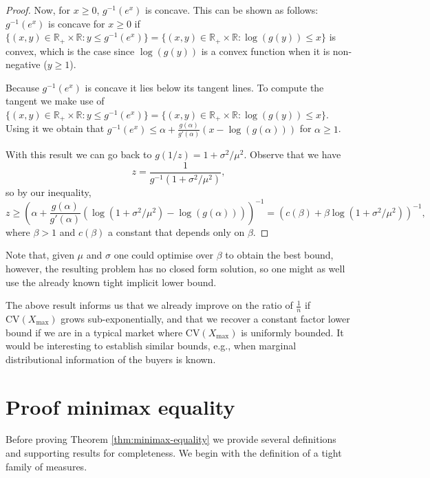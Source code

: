 \documentclass[11pt,a4paper]{article}
\numberwithin{equation}{section}
\begin{document}
\begin{proof}
Now, for $x\ge 0$, $g^{-1}(e^x)$ is concave. This can be shown as follows: $g^{-1}(e^x)$ is concave for $x\ge 0$ if $\{(x,y)\in\mathbb{R}_+\times\mathbb{R}:y\le g^{-1}(e^x)\}=\{(x,y)\in\mathbb{R}_+\times\mathbb{R}: \log(g(y))\le x\}$ is convex, which is the case since $\log(g(y))$ is a convex function when it is non-negative ($y\ge 1$).


Because $g^{-1}(e^x)$ is concave it lies below its tangent lines. To compute the tangent we make use of
$\{(x,y)\in\mathbb{R}_+\times\mathbb{R}:y\le g^{-1}(e^x)\}=\{(x,y)\in\mathbb{R}_+\times\mathbb{R}: \log(g(y))\le x\}$. Using it we obtain that 
$g^{-1}(e^x)\le \alpha+\frac{g\left(\alpha\right)}{g'\left(\alpha\right)}\left(x-\log\left(g\left(\alpha\right)\right)\right)$ for $\alpha\ge 1$.

With this result we can go back to $g(1/z)=1+\sigma^2/\mu^2$. Observe that we have $$z=\frac{1}{g^{-1}(1+\sigma^2/\mu^2)},$$ so by our inequality,
$$z\ge\left(\alpha+\frac{g\left(\alpha\right)}{g'\left(\alpha\right)}\left(\log\left(1+\sigma^2/\mu^2\right)-\log\left(g\left(\alpha\right)\right)\right)\right)^{-1}=(c(\beta)+\beta\log (1+\sigma^2/\mu^2))^{-1},$$ where $\beta > 1$ and $c(\beta)$ a constant that depends only on $\beta$.
\end{proof}
Note that, given $\mu$ and $\sigma$ one could optimise over $\beta$ to obtain the best bound, however, the resulting problem has no closed form solution, so one might as well use the already known tight implicit lower bound.

The above result informs us that we already improve on the ratio of $\frac{1}{n}$ if $\mathrm{CV}(X_{\max})$ grows sub-exponentially, and that we recover a constant factor lower bound if we are in a typical market where $\mathrm{CV}(X_{\max})$ is uniformly bounded. It would be interesting to establish similar bounds, e.g., when marginal distributional information of the buyers is known.



\newpage


\newpage









\appendix
\section{Proof minimax equality}\label{proof:minimax-equality}
Before proving Theorem \ref{thm:minimax-equality} we provide several definitions and supporting results for completeness.
We begin with the definition of a tight family of measures.
\end{document}
